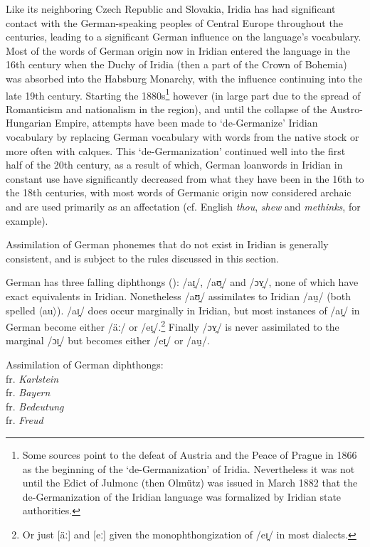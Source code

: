 Like its neighboring Czech Republic and Slovakia, Iridia has had significant contact with the German-speaking peoples of Central Europe throughout the centuries, leading to a significant German influence on the language's vocabulary. Most of the words of German origin now in Iridian entered the language in the 16th century when the Duchy of Iridia (then a part of the Crown of Bohemia) was absorbed into the Habsburg Monarchy, with the influence continuing into the late 19th century. Starting the 1880s\footnote{Some sources point to the defeat of Austria and the Peace of Prague in 1866 as the beginning of the `de-Germanization' of Iridia. Nevertheless it was not until the Edict of Julmonc (then Olm\"utz) was issued in March 1882 that the de-Germanization of the Iridian language was formalized by Iridian state authorities.} however (in large part due to the spread of Romanticism and nationalism in the region), and until the collapse of the Austro-Hungarian Empire, attempts have been made to `de-Germanize' Iridian vocabulary by replacing German vocabulary with words from the native stock or more often with calques. This `de-Germanization' continued well into the first half of the 20th century, as a result of which, German loanwords in Iridian in constant use have significantly decreased from what they have been in the 16th to the 18th centuries, with most words of Germanic origin now considered archaic and are used primarily as an affectation (cf. English \emph{thou}, \emph{shew} and \emph{methinks}, for example).

Assimilation of German phonemes that do not exist in Iridian is generally consistent, and is subject to the rules discussed in this section.

German has three falling diphthongs (\cite{wiese1996}): /aɪ̯/, /aʊ̯/ and /ɔʏ̯/, none of which have exact equivalents in Iridian. Nonetheless /aʊ̯/ assimilates to Iridian /au̯/ (both spelled $\langle$au$\rangle$). /aɪ̯/ does occur marginally in Iridian, but most instances of /aɪ̯/ in German become either /\"aː/ or /eɪ̯/.\footnote{Or just [\"aː] and [eː] given the monophthongization of /eɪ̯/ in most dialects.} Finally /ɔʏ̯/ is never assimilated to the marginal /ɔɪ̯/ but becomes either /eɪ̯/ or /au̯/.


\ex
Assimilation of German diphthongs:\\
 fr. \emph{Karlstein}\\
 fr. \emph{Bayern}\\
 fr. \emph{Bedeutung}\\
 fr. \emph{Freud}
\xe

